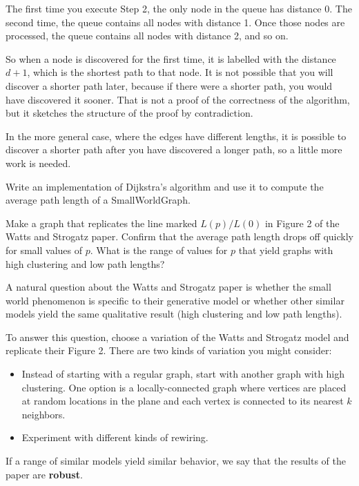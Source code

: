 \documentclass[10pt]{book}
\begin{document}
The first time you execute Step 2, the only node in the queue
has distance 0.  The second time, the queue contains all
nodes with distance 1.  Once those nodes are processed, the
queue contains all nodes with distance 2, and so on.

So when a node is discovered for the first time, it is labelled
with the distance $d+1$, which is the shortest path to that
node.  It is not possible that you will discover a shorter
path later, because if there were a shorter path, you would
have discovered it sooner.  That is not a proof
of the correctness of the algorithm, but it sketches
the structure of the proof by contradiction.

In the more general case, where the edges have different lengths,
it is possible to discover a shorter path after you have
discovered a longer path, so a little more work is needed.

\begin{ex}

Write an implementation of Dijkstra's algorithm and use it
to compute the average path length of a SmallWorldGraph.

Make a graph that replicates the line marked $L(p)/L(0)$ in
Figure 2 of the Watts and Strogatz paper.  Confirm that the 
average path length drops off quickly for
small values of $p$.  What is the range of values for $p$
that yield graphs with high clustering and low path lengths?

\end{ex}


\begin{ex}

A natural question about the Watts and Strogatz paper is
whether the small world phenomenon is specific to their
generative model or whether other similar models yield
the same qualitative result (high clustering and low path lengths).

To answer this question, choose a variation of the
Watts and Strogatz model and replicate their Figure 2.
There are two kinds of variation you might consider:

\begin{itemize}

\item Instead of starting with a regular graph, start with
another graph with high clustering.  One option is a locally-connected
graph where vertices are placed at random locations in the plane
and each vertex is connected to its nearest $k$ neighbors.

\item Experiment with different kinds of rewiring.

\end{itemize}

If a range of similar models yield similar behavior, we
say that the results of the paper are {\bf robust}.

\end{ex}
\end{document}
